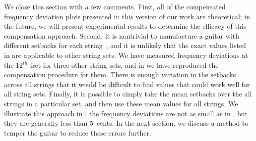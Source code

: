 We close this section with a few comments. First, all of the compensated frequency deviation plots presented in this version of our work are theoretical; in the future, we will present experimental results to determine the efficacy of this compensation approach. Second, it is nontrivial to manufacture a guitar with different setbacks for each string~\cite{ref:byers1996cgi}, and it is unlikely that the exact values listed in  are applicable to other string sets. We have measured frequency deviations at the 12$^{th}$ fret for three other string sets, and in  we have reproduced the compensation procedure for them. There is enough variation in the setbacks across all strings that it would be difficult to find values that could work well for all string sets. Finally, it is possible to simply take the mean setbacks over the all strings in a particular set, and then use these mean values for all strings. We illustrate this approach in ; the frequency deviations are not as small as in , but they are generally less than 5~cents. In the next section, we discuss a method to temper the guitar to reduce these errors further. 